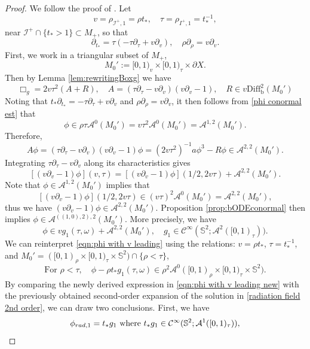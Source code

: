 \documentclass[10pt,a4paper,reqno]{amsart}
\newcommand{\CI}{\mathcal{C}^\infty}
\newcommand{\A}{\mathcal{A}}
\renewcommand{\S}{{\mathbb S}}
\newcommand{\p}{\phi}
\theoremstyle{definition}
\theoremstyle{remark}
\numberwithin{equation}{section}
\newcommand{\ts}{t_*}
\newcommand{\Diffb}{\mathrm{Diff}_\mathrm{b}}
\begin{document}
\begin{proof}
We %
follow the proof of \cite[Theorem 3.9]{Hin22}. Let
	\[
	v = \rho_{\mathscr I^{+},1} = \rho \ts,\quad \tau = \rho_{I^+,1} = \ts^{-1},
	\]
	near $\mathscr I^{+}\cap\{\ts>1\}\subset M_+$, so that
	\[
	\partial_{\ts} = \tau (-\tau\partial_\tau + v\partial_v),\quad \rho\partial_\rho = v\partial_v.
	\]
    First, we work in a triangular subset of $M_+$, 
    \[
        M_0' := [0,1)_v \times [0,1)_\tau \times \partial X.
    \]
    Then by Lemma \ref{lem:rewritingBoxg} we have
	\[
	\Box_g = 2v\tau^2 (A+R),\quad A = (\tau\partial_\tau - v\partial_v)(v\partial_v - 1),\quad R\in v\Diffb^2(M_0')
	\]
	Noting that $\ts\partial_{\ts} = -\tau\partial_\tau + v\partial_v$ and $\rho\partial_\rho = v\partial_v$, it then follows from \eqref{phi conormal est} that 
	\[
	\p\in \rho\tau \A^{0}(M_0') = v\tau^2 \A^{0}(M_0') = \A^{1,2}(M_0').
	\] 
	Therefore,
	\[
	A\p = (\tau\partial_\tau - v\partial_v)(v\partial_v - 1)\p = (2v\tau^2)^{-1} a \p^3 - R\p \in \A^{2,2}(M_0').
	\]
	Integrating $\tau\partial_\tau - v\partial_v$ along its characteristics gives
	\[
	[(v\partial_v - 1)\p](v,\tau) = [(v\partial_v - 1)\p](1/2,2v\tau) + \A^{2,2}(M_0').
	\]
	Note that $\p\in \A^{1,2}(M_0')$ implies that
	\[
	[(v\partial_v - 1)\p](1/2,2v\tau)\in (v\tau)^2 \A^{0}(M_0') = \A^{2,2}(M_0'),
	\]
	thus we have $(v\partial_v - 1)\p \in \A^{2,2}(M_0')$. Proposition \ref{prop:bODEconormal} then implies $\p \in \A^{((1,0),2),2}(M_0')$. More precisely, we have
	\begin{equation}
		\label{eqn:phi with v leading}
		\phi \in v g_1(\tau,\omega) + \A^{2,2}(M_0'),\quad g_1\in\CI(\S^2;\A^2([0,1)_\tau)).
	\end{equation} 
We can reinterpret \eqref{eqn:phi with v leading} using the relations: $v=\rho\ts$, $\tau=\ts^{-1}$, and $M_0' = ([0,1)_\rho \times [0,1)_\tau \times \S^2) \cap \{\rho<\tau\}$,
	\begin{equation}
		\label{eqn:phi with v leading new}
		\textrm{For }\rho<\tau,\quad \phi - \rho \ts g_1(\tau,\omega) \in \rho^2 \A^0([0,1)_\rho \times [0,1)_\tau \times \S^2).
	\end{equation}
	By comparing the newly derived expression in \eqref{eqn:phi with v leading new} with the previously obtained second-order expansion of the solution in \eqref{radiation field 2nd order}, we can draw two conclusions. First, we have
	\begin{equation}
		\label{1=t*g1}
		\phi_{\rm{rad},1} = \ts g_1
        \text{  where } \ts g_1 \in \CI(\S^2;\A^1([0,1)_\tau)),
        \end{equation}

\end{proof}
\end{document}
